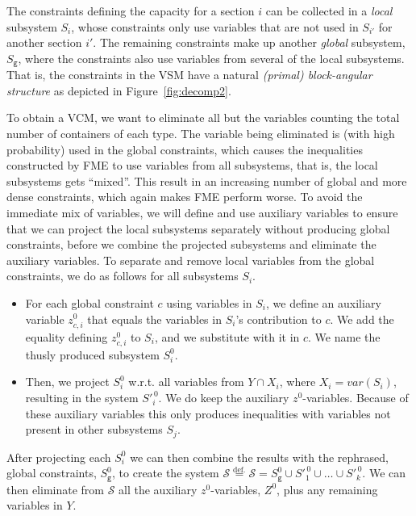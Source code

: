 \documentclass{llncs}
\newcommand{\trt}[1]{\texttt{#1}}
\newcommand{\mi}{\mathit}
\begin{document}
The constraints defining the capacity for a section $i$ can be collected in a \emph{local} subsystem $S_i$, whose constraints only use variables that are not used in $S_{i'}$ for another section $i'$. The remaining constraints make up another \emph{global} subsystem, $S_\texttt{g}$, where the constraints also use variables from several of the local subsystems. That is, the constraints in the VSM have a natural \emph{(primal) block-angular structure} \cite{williams} as depicted in Figure~\ref{fig:decomp2}.

To obtain a VCM, we want to eliminate all but the variables counting the total number of containers of each type. The variable being eliminated is (with high probability) used in the global constraints, which causes the inequalities constructed by FME to use variables from all subsystems, that is, the local subsystems gets ``mixed''. This result in an increasing number of global and more dense constraints, which again makes FME perform worse. 
To avoid the immediate mix of variables, we will define and use auxiliary variables to ensure that we can project the local subsystems separately without producing global constraints, before we combine the projected subsystems and eliminate the auxiliary variables. To separate and remove local variables from the global constraints, we do as follows for all subsystems $S_i$.

\begin{itemize}\itemsep0em
\item For each global constraint $c$ using variables in $S_i$, we define an auxiliary variable $z^0_{c,i}$ that equals the variables in $S_i$'s contribution to $c$. We add the equality defining $z^0_{c,i}$ to $S_i$, and we substitute with it in $c$. 
We name the thusly produced subsystem $S_i^0$. 
\item Then, we project $S_i^0$ w.r.t. all variables from $Y\cap X_i$, where $X_i=\mi{var}(S_i)$, resulting in the system $S'^{\,0}_i$. We do keep the auxiliary $z^0$-variables. 
Because of these auxiliary variables this only produces inequalities with variables not present in other subsystems $S_j$. 
\end{itemize}
After projecting each $S_i^0$ we can then combine the results with the rephrased, global constraints, $S_\trt{g}^0$, to create the system $\mathcal{S} \overset{\text{def.}}{=}
\mathcal{S} = S^0_\trt{g} \cup S'^{\,0}_1\cup \ldots \cup S'^{\,0}_k$.
We can then eliminate from $\mathcal{S}$ all the auxiliary $z^0$-variables, $Z^0$, plus any remaining variables in $Y$. 
\end{document}
